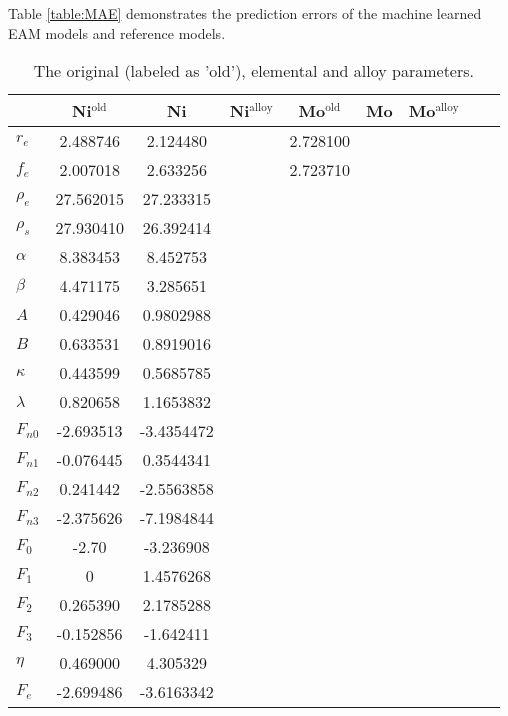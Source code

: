 \documentclass[prb,reprint]{revtex4-2}
\begin{document}
Table \ref{table:MAE} demonstrates the prediction errors of the machine learned
EAM models and reference models. 

\begin{table*}[h]
\centering
\begin{tabular}{lcccccccc}
\hline
    & Ni$^{\mathrm{old}}$ & Ni & Ni$^{\mathrm{alloy}}$ 
    & Mo$^{\mathrm{old}}$ & Mo & Mo$^{\mathrm{alloy}}$ \\
\hline
$r_e$ & 2.488746 & 2.124480 & & 2.728100 & & \\
$f_e$ & 2.007018 & 2.633256 & & 2.723710 & & \\
$\rho_e$ & 27.562015 & 27.233315 & \\ 
$\rho_s$ & 27.930410 & 26.392414 &\\
$\alpha$ & 8.383453 & 8.452753 & \\
$\beta$ & 4.471175 & 3.285651 & \\
$A$ & 0.429046 & 0.9802988 & \\
$B$ & 0.633531 & 0.8919016 & \\
$\kappa$ & 0.443599 & 0.5685785 & \\
$\lambda$ & 0.820658 & 1.1653832 & \\
$F_{n0}$ & -2.693513 & -3.4354472 & \\
$F_{n1}$ & -0.076445 & 0.3544341 & \\
$F_{n2}$ & 0.241442 & -2.5563858 & \\
$F_{n3}$ & -2.375626 & -7.1984844 & \\
$F_{0}$ & -2.70 & -3.236908 & \\
$F_{1}$ & 0 & 1.4576268 & \\
$F_{2}$ & 0.265390 & 2.1785288 & \\
$F_{3}$ & -0.152856 & -1.642411 & \\
$\eta$ & 0.469000 & 4.305329 & \\
$F_e$ & -2.699486 & -3.6163342 & \\
\hline
\end{tabular}
\caption{\label{table:parameters} The original (labeled as 'old'), elemental and 
alloy parameters.}
\end{table*}
\end{document}
